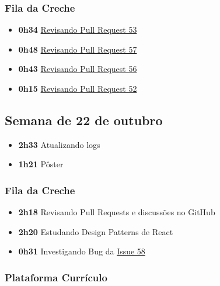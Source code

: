 \hypertarget{fila-da-creche-3}{%
\subsubsection{Fila da Creche}\label{fila-da-creche-3}}

\begin{itemize}
\tightlist
\item
  \textbf{0h34}
  \href{https://github.com/prefeiturasp/SME-FilaDaCreche/pull/53}{Revisando
  Pull Request 53}
\item
  \textbf{0h48}
  \href{https://github.com/prefeiturasp/SME-FilaDaCreche/pull/57}{Revisando
  Pull Request 57}
\item
  \textbf{0h43}
  \href{https://github.com/prefeiturasp/SME-FilaDaCreche/pull/56}{Revisando
  Pull Request 56}
\item
  \textbf{0h15}
  \href{https://github.com/prefeiturasp/SME-FilaDaCreche/pull/52}{Revisando
  Pull Request 52}
\end{itemize}

\hypertarget{semana-de-22-de-outubro}{%
\subsection{Semana de 22 de outubro}\label{semana-de-22-de-outubro}}

\begin{itemize}
\tightlist
\item
  \textbf{2h33} Atualizando logs
\item
  \textbf{1h21} Pôster
\end{itemize}

\hypertarget{fila-da-creche-4}{%
\subsubsection{Fila da Creche}\label{fila-da-creche-4}}

\begin{itemize}
\tightlist
\item
  \textbf{2h18} Revisando Pull Requests e discussões no GitHub
\item
  \textbf{2h20} Estudando Design Patterns de React
\item
  \textbf{0h31} Investigando Bug da
  \href{https://github.com/prefeiturasp/SME-filadacreche/issues/58}{Issue
  58}
\end{itemize}

\hypertarget{plataforma-curruxedculo-3}{%
\subsubsection{Plataforma Currículo}\label{plataforma-curruxedculo-3}}

